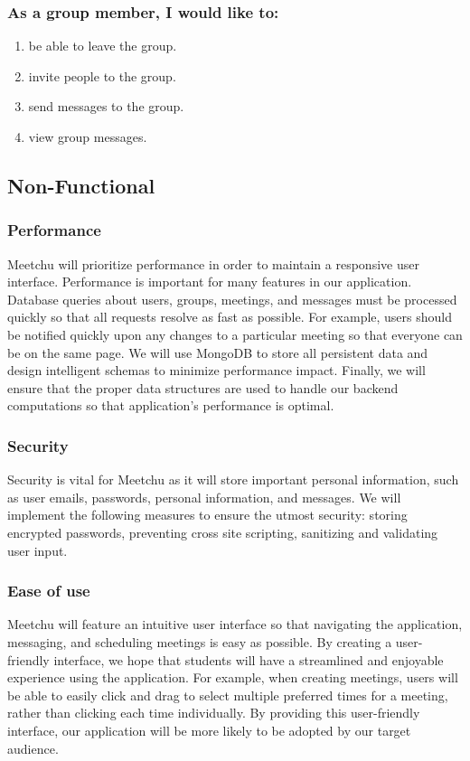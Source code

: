 \documentclass[12pt]{article}
\begin{document}
\subsubsection*{As a group member, I would like to:}
\begin{enumerate}[nolistsep]
    \item be able to leave the group.
    \item invite people to the group.
    \item send messages to the group.
    \item view group messages.
\end{enumerate}

\subsection*{Non-Functional}

\subsubsection*{Performance}

Meetchu will prioritize performance in order to maintain a responsive user interface. Performance is important for many features in our application. Database queries about users, groups, meetings, and messages must be processed quickly so that all requests resolve as fast as possible. For example, users should be notified quickly upon any changes to a particular meeting so that everyone can be on the same page. We will use MongoDB to store all persistent data and design intelligent schemas to minimize performance impact. Finally, we will ensure that the proper data structures are used to handle our backend computations so that application's performance is optimal.

\subsubsection*{Security}

Security is vital for Meetchu as it will store important personal information, such as user emails, passwords, personal information, and messages. We will implement the following measures to ensure the utmost security: storing encrypted passwords, preventing cross site scripting, sanitizing and validating user input.

\subsubsection*{Ease of use}

Meetchu will feature an intuitive user interface so that navigating the application, messaging, and scheduling meetings is easy as possible. By creating a user-friendly interface, we hope that students will have a streamlined and enjoyable experience using the application. For example, when creating meetings, users will be able to easily click and drag to select multiple preferred times for a meeting, rather than clicking each time individually. By providing this user-friendly interface, our application will be more likely to be adopted by our target audience.
\end{document}
